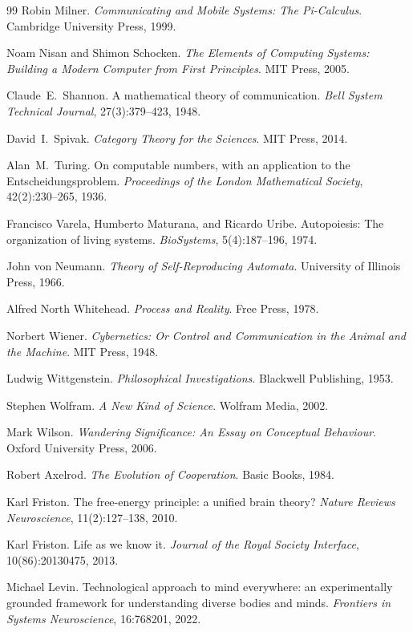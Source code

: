 \documentclass[11pt,a4paper,openany]{book}
\theoremstyle{plain}
\theoremstyle{definition}
\theoremstyle{remark}
\begin{document}
\begin{thebibliography}{99}
Robin Milner.
\textit{Communicating and Mobile Systems: The Pi-Calculus}.
Cambridge University Press, 1999.

Noam Nisan and Shimon Schocken.
\textit{The Elements of Computing Systems:
Building a Modern Computer from First Principles}.
MIT Press, 2005.

Claude~E.\ Shannon.
A mathematical theory of communication.
\textit{Bell System Technical Journal},
27(3):379--423, 1948.

David~I.\ Spivak.
\textit{Category Theory for the Sciences}.
MIT Press, 2014.

Alan~M.\ Turing.
On computable numbers, with an application to the Entscheidungsproblem.
\textit{Proceedings of the London Mathematical Society},
42(2):230--265, 1936.

Francisco Varela, Humberto Maturana, and Ricardo Uribe.
Autopoiesis: The organization of living systems.
\textit{BioSystems},
5(4):187--196, 1974.

John von Neumann.
\textit{Theory of Self-Reproducing Automata}.
University of Illinois Press, 1966.

Alfred North Whitehead.
\textit{Process and Reality}.
Free Press, 1978.

Norbert Wiener.
\textit{Cybernetics: Or Control and Communication in the Animal and the Machine}.
MIT Press, 1948.

Ludwig Wittgenstein.
\textit{Philosophical Investigations}.
Blackwell Publishing, 1953.

Stephen Wolfram.
\textit{A New Kind of Science}.
Wolfram Media, 2002.

Mark Wilson.
\textit{Wandering Significance: An Essay on Conceptual Behaviour}.
Oxford University Press, 2006.

Robert Axelrod.
\textit{The Evolution of Cooperation}.
Basic Books, 1984.

Karl Friston.
The free-energy principle: a unified brain theory?
\textit{Nature Reviews Neuroscience},
11(2):127--138, 2010.

Karl Friston.
Life as we know it.
\textit{Journal of the Royal Society Interface},
10(86):20130475, 2013.

Michael Levin.
Technological approach to mind everywhere:
an experimentally grounded framework for understanding
diverse bodies and minds.
\textit{Frontiers in Systems Neuroscience},
16:768201, 2022.

\end{thebibliography}
\end{document}
